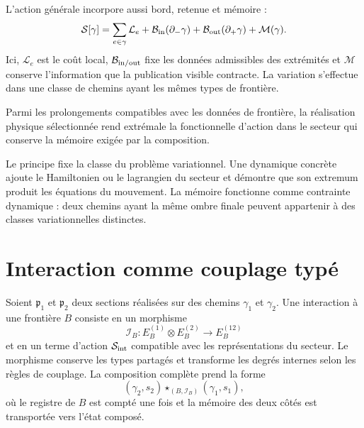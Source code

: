 L'action générale incorpore aussi bord, retenue et mémoire :
\begin{equation}
 \mathcal S[\gamma]
 =\sum_{e\in\gamma}\mathcal L_e
 +\mathcal B_{\rm in}(\partial_-\gamma)
 +\mathcal B_{\rm out}(\partial_+\gamma)
 +\mathcal M(\gamma).
 \label{eq:mt-accion-ruta-general}
\end{equation}
Ici, $\mathcal L_e$ est le coût local, $\mathcal B_{\rm in/out}$ fixe les
données admissibles des extrémités et $\mathcal M$ conserve l'information que
la publication visible contracte. La variation s'effectue dans une classe
de chemins ayant les mêmes types de frontière.

\begin{lecturafisica}[title={Principe d'interaction minimale compatible avec la mémoire}]
\label{prin:mt-minima-interaccion}
Parmi les prolongements compatibles avec les données de frontière, la
réalisation physique sélectionnée rend extrémale la fonctionnelle d'action dans le
secteur qui conserve la mémoire exigée par la composition.
\end{lecturafisica}

Le principe fixe la classe du problème variationnel. Une dynamique concrète
ajoute le Hamiltonien ou le lagrangien du secteur et démontre que son extremum
produit les équations du mouvement. La mémoire fonctionne comme contrainte
dynamique : deux chemins ayant la même ombre finale peuvent appartenir à des classes
variationnelles distinctes.

\section{Interaction comme couplage typé}

Soient $\mathfrak p_1$ et $\mathfrak p_2$ deux sections réalisées sur des chemins
$\gamma_1$ et $\gamma_2$. Une interaction à une frontière $B$ consiste en
un morphisme
\begin{equation}
 \mathcal I_B:
 E^{(1)}_B\otimes E^{(2)}_B
 \longrightarrow E^{(12)}_B
 \label{eq:mt-interaccion-frontera}
\end{equation}
et en un terme d'action $\mathcal S_{\rm int}$ compatible avec les
représentations du secteur. Le morphisme conserve les types partagés et
transforme les degrés internes selon les règles de couplage. La
composition complète prend la forme
\[
 (\gamma_2,s_2)\star_{(B,\mathcal I_B)}(\gamma_1,s_1),
\]
où le registre de $B$ est compté une fois et la mémoire des deux côtés est
transportée vers l'état composé.

